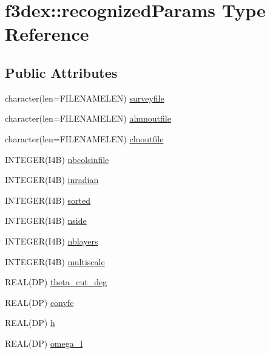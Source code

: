 \hypertarget{typef3dex_1_1recognized_params}{
\section{f3dex::recognizedParams Type Reference}
\label{typef3dex_1_1recognized_params}
}
\subsection*{Public Attributes}
\begin{DoxyCompactItemize}
\item 
character(len=FILENAMELEN) \hyperlink{typef3dex_1_1recognized_params_ae790f95a6f12d6150a22bcc04e0ffa52}{surveyfile}
\item 
character(len=FILENAMELEN) \hyperlink{typef3dex_1_1recognized_params_ad60f17397a0f4d31dbdd893bf3410653}{almnoutfile}
\item 
character(len=FILENAMELEN) \hyperlink{typef3dex_1_1recognized_params_a3f299fef8aa9927191c98b106425eba2}{clnoutfile}
\item 
INTEGER(I4B) \hyperlink{typef3dex_1_1recognized_params_a9d888847a809773b161086464c8aee37}{nbcolsinfile}
\item 
INTEGER(I4B) \hyperlink{typef3dex_1_1recognized_params_a99bf83fd9a59b48da7fe58f482dac3ba}{inradian}
\item 
INTEGER(I4B) \hyperlink{typef3dex_1_1recognized_params_a10ab9998ddb51c3bf0ea4a51e6196f88}{sorted}
\item 
INTEGER(I4B) \hyperlink{typef3dex_1_1recognized_params_a235ac2c9d0b577af0a76bbb4d2083beb}{nside}
\item 
INTEGER(I4B) \hyperlink{typef3dex_1_1recognized_params_a8198a96740db934ad856b3f7a8ec8ccc}{nblayers}
\item 
INTEGER(I4B) \hyperlink{typef3dex_1_1recognized_params_ab329ab9746c243c7826394dad56e130c}{multiscale}
\item 
REAL(DP) \hyperlink{typef3dex_1_1recognized_params_ab267c4b31f86c2a6c7937f43d62ebccd}{theta\_\-cut\_\-deg}
\item 
REAL(DP) \hyperlink{typef3dex_1_1recognized_params_a52a0bba6487dc7381b20e2287a14e74b}{convfc}
\item 
REAL(DP) \hyperlink{typef3dex_1_1recognized_params_a48d5955018291fe9ab81fe416f69fa12}{h}
\item 
REAL(DP) \hyperlink{typef3dex_1_1recognized_params_ac86f4fd432d2079a0146faa7b8998caa}{omega\_\-l}
\item 

\end{DoxyCompactItemize}
